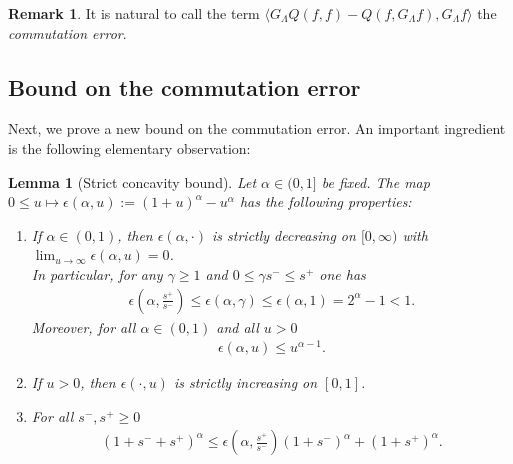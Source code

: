 \documentclass[11pt,a4paper,reqno]{amsart}
\theoremstyle{plain}
\newtheorem{lemma}[proposition]{Lemma}
\theoremstyle{definition}
\newtheorem{remark}[proposition]{Remark}
\begin{document}
\begin{remark}
It is natural to call the term 	$\langle G_{\Lambda}Q(f,f) - Q(f,G_{\Lambda}f), G_{\Lambda}f\rangle$ the \emph{commutation error}.
\end{remark}

\subsection{Bound on the commutation error}\label{ssec:ce}
Next, we prove a new bound on the commutation error. An important ingredient is the following elementary observation:
\begin{lemma}[Strict concavity bound]\label{lem:abalpha}
	Let $\alpha \in(0,1]$ be fixed. The map $0\leq u\mapsto\epsilon(\alpha, u):=(1+u)^{\alpha} - u^{\alpha}$ has the following properties:
	\begin{enumerate}[label=(\roman*)]
		\item If $\alpha \in (0,1)$, then $\epsilon(\alpha,\cdot)$ is \emph{strictly} decreasing on $[0, \infty)$ with $\lim_{u\to\infty} \epsilon(\alpha, u) = 0$. \\
		In particular, for any $\gamma\geq 1$ and $0\leq \gamma s^- \leq s^+$ one has
		\begin{align}\label{eq:epsilon-inequ}
			 \epsilon\left(\alpha,\tfrac{s^+}{s^-}\right)\le \epsilon\left(\alpha,\gamma \right)\le \epsilon(\alpha,1)= 2^\alpha-1<1.
		\end{align}
		Moreover, for all $\alpha\in (0,1)$ and all $u>0$
			\begin{align*}
				\epsilon\left(\alpha, u \right) \le u^{\alpha-1} .
			\end{align*}
		\item If  $u>0$, then $\epsilon(\cdot,u)$ is \emph{strictly} increasing on $[0, 1]$.
		\item For all  $s^-, s^+ \ge 0$
			\begin{align*}
			(1+s^-+s^+)^\alpha \le  \epsilon\left(\alpha,\tfrac{s^+}{s^-}\right)(1+s^-)^\alpha + (1+s^+)^\alpha.
			\end{align*}
	\end{enumerate}
\end{lemma}
\end{document}
